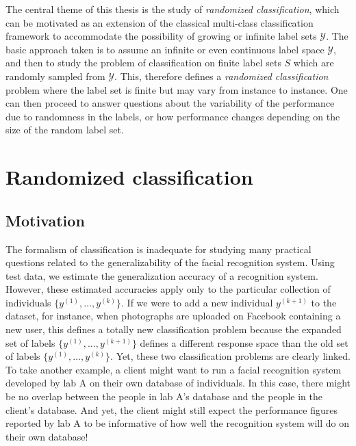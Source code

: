 \documentclass[12pt]{article}
\begin{document}
The central theme of this thesis is the study of \emph{randomized
  classification}, which can be motivated as an extension of the
classical multi-class classification framework to accommodate the
possibility of growing or infinite label sets $\mathcal{Y}$. The basic
approach taken is to assume an infinite or even continuous label space
$\mathcal{Y}$, and then to study the problem of classification on
finite label sets $S$ which are randomly sampled from $\mathcal{Y}.$
This, therefore defines a \emph{randomized classification} problem
where the label set is finite but may vary from instance to instance.
One can then proceed to answer questions about the variability of the
performance due to randomness in the labels, or how performance
changes depending on the size of the random label set.

\section{Randomized classification}\label{sec:rc_motivation}

\subsection{Motivation}
The formalism of classification is inadequate for studying many
practical questions related to the generalizability of the facial
recognition system.  Using test data, we estimate the generalization
accuracy of a recognition system.  However, these estimated accuracies
apply only to the particular collection of individuals
$\{y^{(1)},\hdots, y^{(k)}\}$.  If we were to add a new individual
$y^{(k+1)}$ to the dataset, for instance, when photographs are
uploaded on Facebook containing a new user, this defines a totally new
classification problem because the expanded set of labels
$\{y^{(1)},\hdots, y^{(k+1)}\}$ defines a different response space
than the old set of labels $\{y^{(1)},\hdots, y^{(k)}\}$.  Yet, these
two classification problems are clearly linked.  To take another
example, a client might want to run a facial recognition system
developed by lab A on their own database of individuals.  In this
case, there might be no overlap between the people in lab A's database
and the people in the client's database.  And yet, the client might
still expect the performance figures reported by lab A to be
informative of how well the recognition system will do on their own
database!
\end{document}
